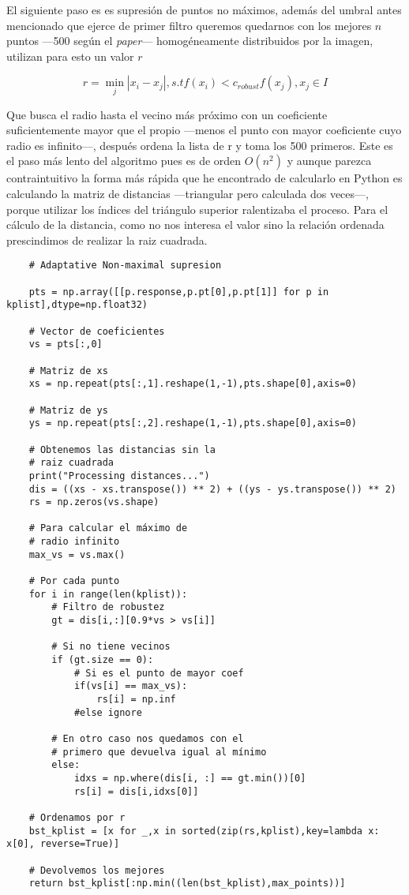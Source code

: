 \documentclass{article}
\begin{document}
El siguiente paso es es supresión de puntos no máximos, además del umbral antes mencionado que ejerce de primer filtro queremos quedarnos con los mejores $n$ puntos  ---500 según el \textit{paper}--- homogéneamente distribuidos por la imagen, utilizan para esto un valor $r$

\[ r = \min_j |x_i - x_j|, s.t f(x_i) < c_{robust}f(x_j), x_j \in I \]

Que busca el radio hasta el vecino más próximo con un coeficiente suficientemente mayor que el propio ---menos el punto con mayor coeficiente cuyo radio es infinito---, después ordena la lista de r y toma los 500 primeros. Este es el paso más lento del algoritmo pues es de orden $O(n^2)$ y aunque parezca contraintuitivo la forma más rápida que he encontrado de calcularlo en Python es calculando la matriz de distancias ---triangular pero calculada dos veces---, porque utilizar los índices del triángulo superior ralentizaba el proceso. Para el cálculo de la distancia, como no nos interesa el valor sino la relación ordenada prescindimos de realizar la raiz cuadrada.

\begin{lstlisting}
    # Adaptative Non-maximal supresion

    pts = np.array([[p.response,p.pt[0],p.pt[1]] for p in kplist],dtype=np.float32)

    # Vector de coeficientes
    vs = pts[:,0]
    
    # Matriz de xs
    xs = np.repeat(pts[:,1].reshape(1,-1),pts.shape[0],axis=0)
    
    # Matriz de ys
    ys = np.repeat(pts[:,2].reshape(1,-1),pts.shape[0],axis=0)

    # Obtenemos las distancias sin la
    # raiz cuadrada
    print("Processing distances...")
    dis = ((xs - xs.transpose()) ** 2) + ((ys - ys.transpose()) ** 2)
    rs = np.zeros(vs.shape)
    
    # Para calcular el máximo de 
    # radio infinito
    max_vs = vs.max()
    
    # Por cada punto
    for i in range(len(kplist)):
    	# Filtro de robustez
        gt = dis[i,:][0.9*vs > vs[i]]
        
        # Si no tiene vecinos
        if (gt.size == 0):
        	# Si es el punto de mayor coef
            if(vs[i] == max_vs):
                rs[i] = np.inf
            #else ignore
        
        # En otro caso nos quedamos con el 
        # primero que devuelva igual al mínimo
        else:
            idxs = np.where(dis[i, :] == gt.min())[0]
            rs[i] = dis[i,idxs[0]]
	
	# Ordenamos por r
    bst_kplist = [x for _,x in sorted(zip(rs,kplist),key=lambda x: x[0], reverse=True)]
	
	# Devolvemos los mejores
    return bst_kplist[:np.min((len(bst_kplist),max_points))]
\end{lstlisting}
\end{document}
